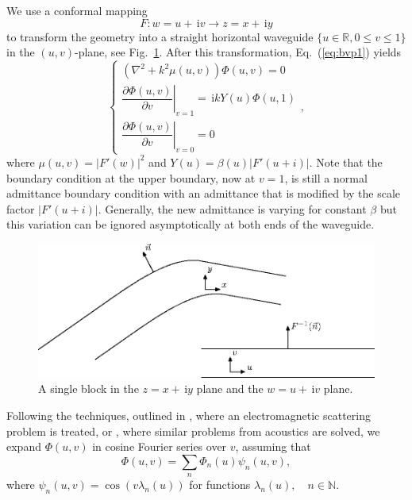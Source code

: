 \documentclass[numreferences]{kluwer}
\providecommand{\abs}[1]{\left\lvert#1\right\rvert}
\renewcommand{\Phi}{\varPhi}
\renewcommand{\i}{\,\mathrm{i}}
\newcommand{\R}{\mathbb R}
\newcommand{\pd}[2]{\dfrac{\partial#1}{\partial#2}}
\renewcommand{\Phi}{\varPhi}
\begin{document}
We use a conformal mapping
\begin{equation*}
  F:w=u+\i v\to z=x+\i y
\end{equation*}
to transform the geometry into a straight horizontal waveguide
\mbox{$\{u\in\R,0\le v\le1\}$} in the $(u,v)$-plane, see
Fig.~\ref{fig:confmap}. After this transformation, Eq.~(\ref{eq:bvp1})
yields
\begin{equation}
  \label{eq:bvp2}
  \begin{cases}
    \left(\nabla^2+k^2\mu(u,v)\right)\Phi(u,v)=0\\[1ex]
    \left.\pd{\Phi(u,v)}v\right|_{v=1}=\i kY(u)\Phi(u,1)\\[1.5ex]
    \left.\pd{\Phi(u,v)}v\right|_{v=0}=0
  \end{cases},
\end{equation}
where $\mu(u,v)=\abs{F'(w)}^2$ and $Y(u)=\beta(u)\abs{F'(u+i)}$. Note
that the boundary condition at the upper boundary, now at $v=1$, is
still a normal admittance boundary condition with an admittance that is
modified by the scale factor $\abs{F'(u+i)}$. Generally, the new
admittance is varying for constant $\beta$ but this variation can be
ignored asymptotically at both ends of the waveguide.
\begin{figure}[htb]
  \centering
  \includegraphics[scale=1]{waveguide-3}
  \caption{A single block in the $z=x+\i y$ plane and the $w=u+\i v$
    plane.}
  \label{fig:confmap}
\end{figure}

Following the techniques, outlined in \cite{Andersson-Nilsson:2009},
where an electromagnetic scattering problem is treated, or
\cite{Nilsson:2002}, where similar problems from acoustics are solved,
we expand $\Phi(u,v)$ in cosine Fourier series over $v$, assuming that
\begin{equation}
  \label{eq:fcosseries}
  \Phi(u,v)=\sum_n\Phi_n(u)\psi_n(u,v),
\end{equation}
where $\psi_n(u,v)=\cos(v\lambda_n(u))$ for functions
$\lambda_n(u),\quad n\in\mathbb N$.
\end{document}
